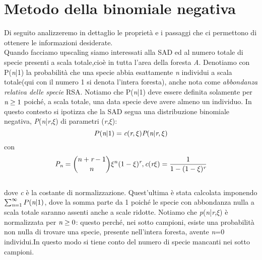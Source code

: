 \section{Metodo della binomiale negativa}
Di seguito analizzeremo in dettaglio le proprietà e i passaggi che ci permettono di ottenere le informazioni desiderate.\\
Quando facciamo upscaling siamo interessati alla SAD ed al numero totale di specie presenti a scala totale,cioè in tutta l'area della foresta \emph{A}.
Denotiamo con P(\emph{n}|1) la probabilità che una specie abbia esattamente \emph{n} individui a scala totale(qui con il numero 1 si denota l'intera foresta), anche nota come \emph{abbondanza relativa delle specie} RSA.
Notiamo che P(\emph{n}|1) deve essere definita solamente per $\emph{n}\ge1$ poiché, a scala totale, una data specie deve avere almeno un individuo.
In questo contesto si ipotizza che la SAD segua una distribuzione binomiale negativa, \emph{P}(\emph{n}|\emph{r},$\xi$) di parametri (\emph{r},$\xi$):
\\ 
\begin{equation}
 P(\emph{n}|1)=\emph{c}(\emph{r},\xi)\emph{P}(\emph{n}|\emph{r},\xi)
 \label{eq:NBfunctform}
\end{equation}
con 
\begin{equation}
    \emph{P}_\emph{n}=\binom{n+\emph{r}-1}{n}\xi^n(1-\xi)^{\emph{r}},      
    \emph{c}(\emph{r}\xi)=\frac{1}{1-(1-\xi)^{\emph{r}}}
\end{equation}
\\ 
dove \emph{c} è la costante di normalizzazione.
Quest'ultima è stata calcolata imponendo $\sum_{\emph{n}=1}^\infty P(\emph{n}|1)$, dove la somma parte da 1 poiché le specie con abbondanza nulla a scala totale saranno assenti anche a scale ridotte.
Notiamo che \emph{p}(\emph{n}|\emph{r},$\xi$) è normalizzata per $\emph{n}\ge0$: questo perché, nei sotto campioni, esiste una probabilità non nulla di trovare una specie, presente nell'intera foresta, avente \emph{n}=0 individui.In questo modo si tiene conto del numero di specie mancanti nei sotto campioni.\\
